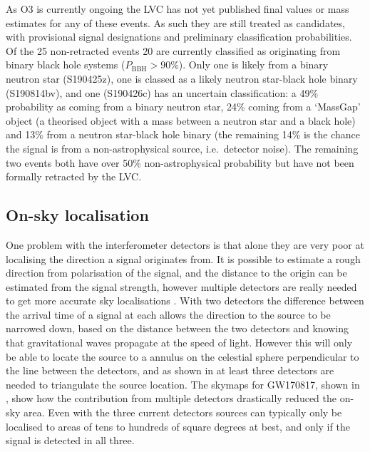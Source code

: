 \begin{colsection}
\begin{colsection}
As O3 is currently ongoing the LVC has not yet published final values or mass estimates for any of these events. As such they are still treated as candidates, with provisional signal designations and preliminary classification probabilities. Of the 25 non-retracted events 20 are currently classified as originating from binary black hole systems ($P_\text{BBH}>90\%$). Only one is likely from a binary neutron star (S190425z), one is classed as a likely neutron star-black hole binary (S190814bv), and one (S190426c) has an uncertain classification: a 49\% probability as coming from a binary neutron star, 24\% coming from a `MassGap' object (a theorised object with a mass between a neutron star and a black hole) and 13\% from a neutron star-black hole binary (the remaining 14\% is the chance the signal is from a non-astrophysical source, i.e.\ detector noise). The remaining two events both have over 50\% non-astrophysical probability but have not been formally retracted by the LVC.\@

\end{colsection}

\newpage
\subsection{On-sky localisation}
\label{sec:gw_localisation}
\begin{colsection}

One problem with the interferometer detectors is that alone they are very poor at localising the direction a signal originates from. It is possible to estimate a rough direction from polarisation of the signal, and the distance to the origin can be estimated from the signal strength, however multiple detectors are really needed to get more accurate sky localisations \citep{GW_localisation, GW_localisation2}. With two detectors the difference between the arrival time of a signal at each allows the direction to the source to be narrowed down, based on the distance between the two detectors and knowing that gravitational waves propagate at the speed of light. However this will only be able to locate the source to a annulus on the celestial sphere perpendicular to the line between the detectors, and as shown in  at least three detectors are needed to triangulate the source location. The skymaps for GW170817, shown in , show how the contribution from multiple detectors drastically reduced the on-sky area. Even with the three current detectors sources can typically only be localised to areas of tens to hundreds of square degrees at best, and only if the signal is detected in all three.


\end{colsection}
\end{colsection}
